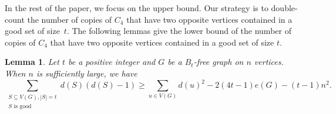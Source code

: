 \documentclass[11pt,a4paper]{article}
\newtheorem{lemma}{Lemma}[section]
\theoremstyle{definition}
\begin{document}
        In the rest of the paper, we focus on the upper bound. 
        Our strategy is to double-count the number of copies of $C_4$ that have two opposite vertices contained in a good set of size~$t$.
        The following lemmas give the lower bound of the number of copies of $C_4$ that have two opposite vertices contained in a good set of size $t$.


        \begin{lemma}\label{lem: lower bound of number of C4 for Bt}
            Let $t$ be a positive integer and $G$ be a $B_t$-free graph on $n$ vertices. When $n$ is sufficiently large, we have
            \begin{equation*}
                \sum_{\substack{S \subseteq V(G), |S| = t \\ S \text{ is good}}} d(S)(d(S) - 1) \geq \sum_{u \in V(G)} d(u)^2 - 2(4t-1) e(G) - (t-1) n^2.
            \end{equation*}
        \end{lemma}
\end{document}
